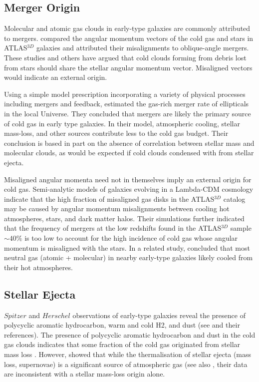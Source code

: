 \documentclass[iop]{emulateapj}
\begin{document}
\subsection{Merger Origin}

Molecular and atomic gas clouds in early-type galaxies are commonly attributed to mergers.   \citet{Davis:11} compared the angular momentum vectors of the cold gas and stars in ATLAS$^{3D}$ galaxies and attributed their misalignments to oblique-angle mergers.  These studies and others \citep{Young:02, Young:08, Crocker:11} have argued that cold clouds forming from debris lost from stars should share the stellar angular momentum vector.  Misaligned vectors would indicate an external origin. 

Using a simple model prescription incorporating a variety of physical processes including mergers and feedback,  \citet{Davis:19} estimated the gas-rich merger rate of ellipticals in the local Universe. They concluded that mergers are likely the primary source of cold gas in early type galaxies.  In their model, atmospheric cooling, stellar mass-loss, and other sources contribute less to the cold gas budget.  Their conclusion is based in part on the absence of correlation between stellar mass and molecular clouds, as would be expected if cold clouds condensed with from stellar ejecta.   

Misaligned angular momenta need not in themselves imply an external origin for cold gas.  Semi-analytic models of galaxies evolving in a Lambda-CDM cosmology \citep{Lagos:15} indicate that the high fraction of misaligned gas disks in the ATLAS$^{3D}$ catalog may be caused by angular momentum misalignments between cooling hot atmospheres, stars, and dark matter halos. Their simulations further indicated that the frequency of mergers at the low redshifts found in the ATLAS$^{3D}$ sample  $\sim 40\%$ is too low to account for the high incidence of cold gas whose angular momentum is misaligned with the stars. In a related study, \citet{Lagos:14} concluded that most neutral gas (atomic + molecular) in nearby early-type galaxies likely cooled from their hot atmospheres. 
\subsection{Stellar Ejecta}

$Spitzer$ and $Herschel$ observations of early-type galaxies reveal the presence of polycyclic aromatic hydrocarbon, warm and cold H2, and dust (see \citet{Werner:14} and their references). The presence of polycyclic aromatic hydrocarbon and dust in the cold gas clouds indicates that some fraction of the cold gas originated from stellar mass loss \citep{Werner:14}.  However, \citet{Goulding:16} showed that while the thermalisation of stellar ejecta (mass loss, supernovae) is a significant source of atmospheric gas (see also \citet{Pellegrini:18}, their data are inconsistent with a stellar mass-loss origin alone. 
\end{document}
